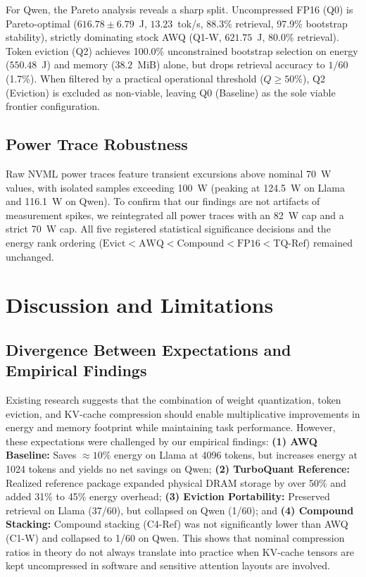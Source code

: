 \documentclass[sigconf,nonacm]{acmart}
\begin{document}
For Qwen, the Pareto analysis reveals a sharp split. Uncompressed FP16 (Q0) is Pareto-optimal ($616.78\pm 6.79$~J, $13.23$~tok/s, 88.3\% retrieval, 97.9\% bootstrap stability), strictly dominating stock AWQ (Q1-W, $621.75$~J, 80.0\% retrieval). Token eviction (Q2) achieves 100.0\% unconstrained bootstrap selection on energy ($550.48$~J) and memory ($38.2$~MiB) alone, but drops retrieval accuracy to $1/60$ (1.7\%). When filtered by a practical operational threshold ($Q \ge 50\%$), Q2 (Eviction) is excluded as non-viable, leaving Q0 (Baseline) as the sole viable frontier configuration.

\subsection{Power Trace Robustness}
\label{sec:robustness}
Raw NVML power traces feature transient excursions above nominal 70~W values, with isolated samples exceeding 100~W (peaking at 124.5~W on Llama and 116.1~W on Qwen). To confirm that our findings are not artifacts of measurement spikes, we reintegrated all power traces with an 82~W cap and a strict 70~W cap. All five registered statistical significance decisions and the energy rank ordering ($\text{Evict} < \text{AWQ} < \text{Compound} < \text{FP16} < \text{TQ-Ref}$) remained unchanged.

\section{Discussion and Limitations}

\subsection{Divergence Between Expectations and Empirical Findings}
Existing research suggests that the combination of weight quantization, token eviction, and KV-cache compression should enable multiplicative improvements in energy and memory footprint while maintaining task performance. However, these expectations were challenged by our empirical findings: \textbf{(1) AWQ Baseline:} Saves $\approx 10\%$ energy on Llama at 4096 tokens, but increases energy at 1024 tokens and yields no net savings on Qwen; \textbf{(2) TurboQuant Reference:} Realized reference package expanded physical DRAM storage by over 50\% and added 31\% to 45\% energy overhead; \textbf{(3) Eviction Portability:} Preserved retrieval on Llama (37/60), but collapsed on Qwen (1/60); and \textbf{(4) Compound Stacking:} Compound stacking (C4-Ref) was not significantly lower than AWQ (C1-W) and collapsed to 1/60 on Qwen. This shows that nominal compression ratios in theory do not always translate into practice when KV-cache tensors are kept uncompressed in software and sensitive attention layouts are involved.
\end{document}

